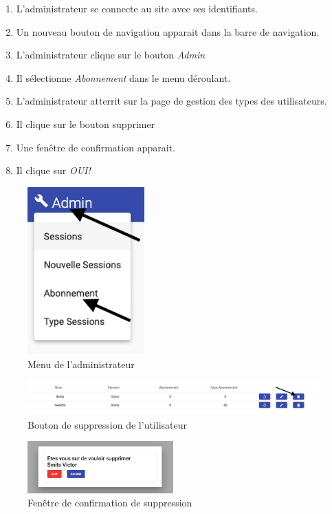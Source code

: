\begin{enumerate}
	\item L'administrateur se connecte au site avec ses identifiants. 
	\item Un nouveau bouton de navigation apparait dans la barre de navigation. 
	\item L'administrateur clique sur le bouton \textit{Admin}
	\item Il sélectionne \textit{Abonnement} dans le menu déroulant. 
	\item L'administrateur atterrit sur la page de gestion des types des utilisateurs. 
	\item Il clique sur le bouton supprimer
	\item Une fenêtre de confirmation apparait. 
	\item Il clique sur \textit{OUI!} 
\end{enumerate}

\newpage
\begin{figure}[h]
	\includegraphics[width=0.4\textwidth,center]{Figures/us15-1}
	\caption{Menu de l'administrateur}
\end{figure}

\vspace{\baselineskip}
\begin{figure}[h]
	\includegraphics[width=\textwidth,center]{Figures/us15-2}
	\caption{Bouton de suppression de l'utilisateur}
\end{figure}

\vspace{\baselineskip}
\begin{figure}[h]
	\includegraphics[width=0.5\textwidth,center]{Figures/us15-3}
	\caption{Fenêtre de confirmation de suppression}
\end{figure}

